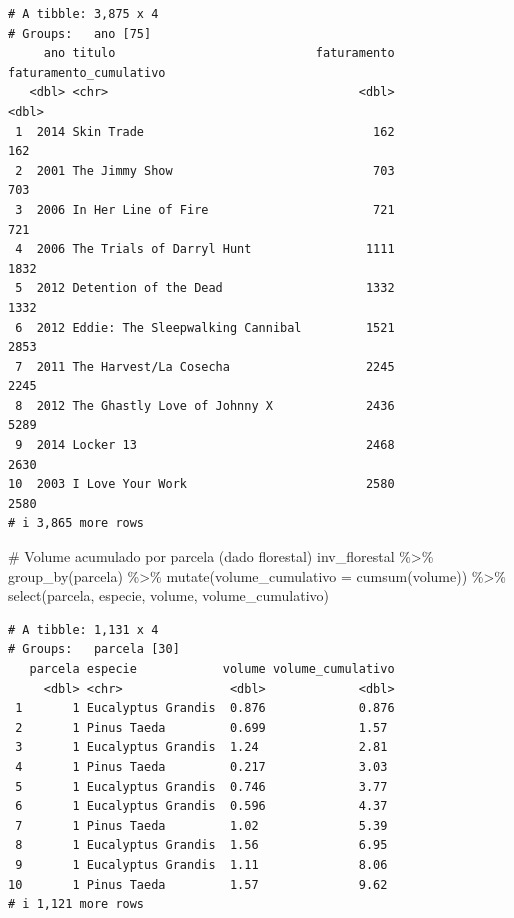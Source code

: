 \documentclass[
  letterpaper,
]{scrbook}
\newenvironment{Shaded}{\begin{snugshade}}{\end{snugshade}}
\newcommand{\AttributeTok}[1]{\textcolor[rgb]{0.40,0.45,0.13}{#1}}
\newcommand{\CommentTok}[1]{\textcolor[rgb]{0.37,0.37,0.37}{#1}}
\newcommand{\FunctionTok}[1]{\textcolor[rgb]{0.28,0.35,0.67}{#1}}
\newcommand{\NormalTok}[1]{\textcolor[rgb]{0.00,0.23,0.31}{#1}}
\newcommand{\SpecialCharTok}[1]{\textcolor[rgb]{0.37,0.37,0.37}{#1}}
\begin{document}
\begin{verbatim}
# A tibble: 3,875 x 4
# Groups:   ano [75]
     ano titulo                            faturamento faturamento_cumulativo
   <dbl> <chr>                                   <dbl>                  <dbl>
 1  2014 Skin Trade                                162                    162
 2  2001 The Jimmy Show                            703                    703
 3  2006 In Her Line of Fire                       721                    721
 4  2006 The Trials of Darryl Hunt                1111                   1832
 5  2012 Detention of the Dead                    1332                   1332
 6  2012 Eddie: The Sleepwalking Cannibal         1521                   2853
 7  2011 The Harvest/La Cosecha                   2245                   2245
 8  2012 The Ghastly Love of Johnny X             2436                   5289
 9  2014 Locker 13                                2468                   2630
10  2003 I Love Your Work                         2580                   2580
# i 3,865 more rows
\end{verbatim}

\begin{Shaded}
\begin{Highlighting}[]
\CommentTok{\# Volume acumulado por parcela (dado florestal)}
\NormalTok{inv\_florestal }\SpecialCharTok{\%\textgreater{}\%} 
  \FunctionTok{group\_by}\NormalTok{(parcela) }\SpecialCharTok{\%\textgreater{}\%} 
  \FunctionTok{mutate}\NormalTok{(}\AttributeTok{volume\_cumulativo =} \FunctionTok{cumsum}\NormalTok{(volume)) }\SpecialCharTok{\%\textgreater{}\%} 
  \FunctionTok{select}\NormalTok{(parcela, especie, volume, volume\_cumulativo)}
\end{Highlighting}
\end{Shaded}

\begin{verbatim}
# A tibble: 1,131 x 4
# Groups:   parcela [30]
   parcela especie            volume volume_cumulativo
     <dbl> <chr>               <dbl>             <dbl>
 1       1 Eucalyptus Grandis  0.876             0.876
 2       1 Pinus Taeda         0.699             1.57 
 3       1 Eucalyptus Grandis  1.24              2.81 
 4       1 Pinus Taeda         0.217             3.03 
 5       1 Eucalyptus Grandis  0.746             3.77 
 6       1 Eucalyptus Grandis  0.596             4.37 
 7       1 Pinus Taeda         1.02              5.39 
 8       1 Eucalyptus Grandis  1.56              6.95 
 9       1 Eucalyptus Grandis  1.11              8.06 
10       1 Pinus Taeda         1.57              9.62 
# i 1,121 more rows
\end{verbatim}
\end{document}

